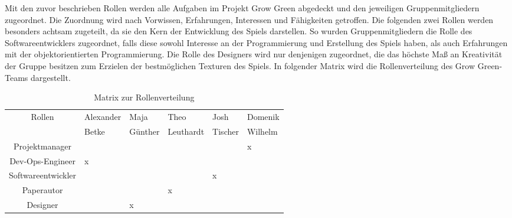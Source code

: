 \vspace{5cm}

Mit den zuvor beschrieben Rollen werden alle Aufgaben im Projekt Grow Green abgedeckt und
den jeweiligen Gruppenmitgliedern zugeordnet. 
Die Zuordnung wird nach Vorwissen, Erfahrungen, Interessen und Fähigkeiten getroffen. 
Die folgenden zwei Rollen werden besonders achtsam zugeteilt, da sie den Kern der Entwicklung des Spiels darstellen.
So wurden Gruppenmitgliedern die Rolle des Softwareentwicklers zugeordnet, falls diese sowohl Interesse
an der Programmierung und Erstellung des Spiels haben, als auch Erfahrungen mit der 
objektorientierten Programmierung.
Die Rolle des Designers wird nur denjenigen zugeordnet, die das höchste Maß an Kreativität der Gruppe besitzen
zum Erzielen der bestmöglichen Texturen des Spiels.
In folgender Matrix wird die Rollenverteilung des Grow Green-Teams dargestellt.

\vspace{2cm}

\begin{table}[H]
    \begin{center}
        \label{tab:rollenverteilung}
        \begin{tabular}{|c|p{2cm}|p{2cm}|p{2cm}|p{2cm}|p{2cm}|}
            \hline
            Rollen 
            & Alexander 
            & Maja 
            & Theo 
            & Josh 
            & Domenik \\
            & Betke
            & Günther
            & Leuthardt
            & Tischer
            & Wilhelm \\
            \hline
            \hline
            Projektmanager &  &  &  &  & x \\
            Dev-Ops-Engineer & x &  &  &  &  \\
            Softwareentwickler &  &  &  & x &  \\
            Paperautor &  &  & x &  &  \\
            Designer &  & x &  &  &  \\
            \hline
        \end{tabular}
        \caption{Matrix zur Rollenverteilung}
    \end{center}
\end{table}